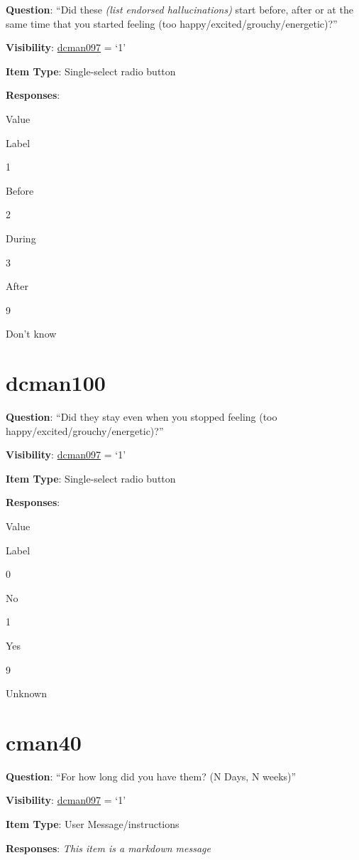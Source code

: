 \documentclass[]{book}
\begin{document}
\textbf{Question}: ``Did these \emph{(list endorsed hallucinations)} start before, after or at the same time that you started feeling (too happy/excited/grouchy/energetic)?''

\textbf{Visibility}: \protect\hyperlink{dcman097}{dcman097} = `1'

\textbf{Item Type}: Single-select radio button

\textbf{Responses}:

Value

Label

1

Before

2

During

3

After

9

Don't know

\hypertarget{dcman100}{%
\section{dcman100}\label{dcman100}}

\textbf{Question}: ``Did they stay even when you stopped feeling (too happy/excited/grouchy/energetic)?''

\textbf{Visibility}: \protect\hyperlink{dcman097}{dcman097} = `1'

\textbf{Item Type}: Single-select radio button

\textbf{Responses}:

Value

Label

0

No

1

Yes

9

Unknown

\hypertarget{cman40}{%
\section{cman40}\label{cman40}}

\textbf{Question}: ``For how long did you have them? (N Days, N weeks)''

\textbf{Visibility}: \protect\hyperlink{dcman097}{dcman097} = `1'

\textbf{Item Type}: User Message/instructions

\textbf{Responses}: \emph{This item is a markdown message}
\end{document}
